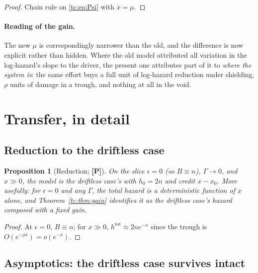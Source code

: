 \documentclass[11pt]{article}
\numberwithin{equation}{section}
\theoremstyle{plain}
\newtheorem{proposition}[theorem]{Proposition}
\theoremstyle{definition}
\theoremstyle{remark}
\begin{document}
\begin{proof}
Chain rule on \eqref{tc:eq:Psi} with $\dot x=\mu$.
\end{proof}

\paragraph{Reading of the gain.}\label{tc:rem:gainreading}
The new $\mu$ is correspondingly narrower than the old, and the
difference is now explicit rather than hidden. Where the old model
attributed all variation in the log-hazard's slope to the driver, the
present one attributes part of it to \emph{where the system is}: the
same effort buys a full unit of log-hazard reduction under shielding,
$\rho$ units of damage in a trough, and nothing at all in the void.

\section{Transfer, in detail}\label{app:transfer}

\subsection{Reduction to the driftless case}\label{tc:subsub:reduction}

\begin{proposition}[Reduction; \textbf{[P]}]\label{tc:prop:reduction}
On the slice $\epsilon=0$ (so $B\equiv n$), $\Gamma\to0$, and $x\gg0$,
the model is the driftless case's with $h_0=2n$ and credit $x-x_0$. More
usefully: for $\epsilon=0$ and any $\Gamma$, the total hazard is a
deterministic function of $x$ alone, and Theorem~\ref{tc:thm:gain}
identifies it as the driftless case's hazard composed with a fixed gain.
\end{proposition}

\begin{proof}
At $\epsilon=0$, $B\equiv n$; for $x\gg0$, $h^{\mathrm{tot}}\approx
2ne^{-x}$ since the trough is $O(e^{-\rho x})=o(e^{-x})$.
\end{proof}

\subsection{Asymptotics: the driftless case survives intact}
\label{tc:sub:asymptotics}
\end{document}
